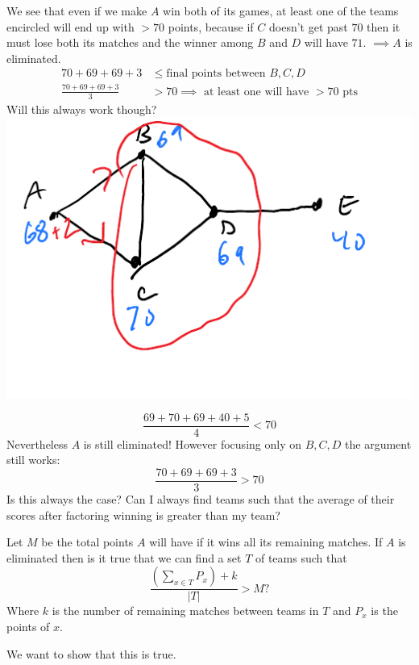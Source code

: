 \documentclass[12 pt]{article}
\begin{document}
        We see that even if we make $A$ win both of its games, at
        least one of the teams encircled will end up with $>70$
        points, because if $C$ doesn't get past $70$ then it must lose
        both its matches and the winner among $B$ and $D$ will have
        $71$. $\implies A$ is eliminated.
        \begin{align*}
          70 + 69 + 69 + 3 & \leq \text{final points between }B,C,D
          \\ \frac{70+69+69+3}{3} & > 70 \implies \text{ at least one
                                    will have $> 70$ pts}
        \end{align*}
        Will this always work though?
        \\ \includegraphics[width=.9\textwidth]{i85.pdf}

        $$\frac{69+70+69+40+5}{4} < 70$$
        Nevertheless $A$ is still eliminated! However focusing only on
        $B,C,D$ the argument still works:
        $$\frac{70 +  69 + 69 + 3}{3} > 70$$
        Is this always the case? Can I always find teams such that the
        average of their scores after factoring winning is greater
        than my team?

        Let $M$ be the total points $A$ will have if it wins all its
        remaining matches. If $A$ is eliminated then is it true that
        we can find a set $T$ of teams such that
        $$\dfrac{\left(\sum_{x \in T}P_x\right) + k}{|T|}>M?$$
        Where $k$ is the number of remaining matches between teams in
        $T$ and $P_x$ is the points of $x$.

        We want to show that this is true.
\end{document}
